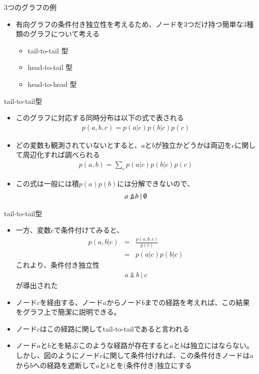 \begin{frame}{3つのグラフの例}
 \begin{itemize}
  \item 有向グラフの条件付き独立性を考えるため、ノードを3つだけ持つ簡単な3種類のグラフについて考える %
        \begin{itemize}
         \item tail-to-tail 型
         \item head-to-tail 型
         \item head-to-head 型
        \end{itemize}
 \end{itemize}
\end{frame}

\begin{frame}{tail-to-tail型}
 \begin{itemize}
  \item このグラフに対応する同時分布は以下の式で表される
        \begin{eqnarray*}
         p(a,b,c) = p(a|c)p(b|c)p(c)
        \end{eqnarray*}
  \item どの変数も観測されていないとすると、$a$と$b$が独立かどうかは両辺を$c$に関して周辺化すれば調べられる
        \begin{eqnarray*}
         p(a,b) = \sum_c p(a|c)p(b|c)p(c)
        \end{eqnarray*}
  \item この式は一般には積$p(a)p(b)$には分解できないので、
        \begin{eqnarray*}
         a \nPerp\ b \ | \ \emptyset
        \end{eqnarray*}
 \end{itemize}
\end{frame}

\begin{frame}{tail-to-tail型}
 \begin{itemize}
  \item 一方、変数$c$で条件付けてみると、
        \begin{eqnarray*}
         p(a,b|c) &=& \frac{p(a,b,c)}{p(c)}\\
         &= & p(a|c)p(b|c)
        \end{eqnarray*}
        これより、条件付き独立性
        \begin{eqnarray*}
         a \Perp b \ | \ c
        \end{eqnarray*}
        が導出された
  \item ノード$c$を経由する、ノード$a$からノード$b$までの経路を考えれば、この結果をグラフ上で簡潔に説明できる。
  \item ノード$c$はこの経路に関して\alert{tail-to-tail}であると言われる
  \item ノード$a$と$b$とを結ぶこのような経路が存在すると$a$と$b$は独立にはならない。しかし、図のようにノード$c$に関して条件付ければ、この条件付きノードは$a$から$b$への経路を遮断して$a$と$b$とを(条件付き)独立にする
 \end{itemize}
\end{frame}


